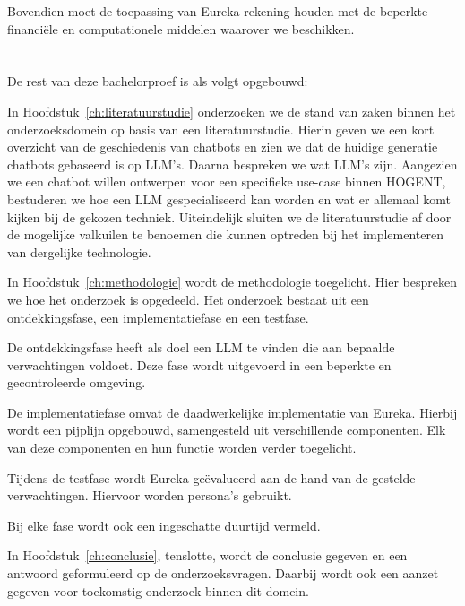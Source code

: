 Bovendien moet de toepassing van Eureka rekening houden met de beperkte financiële en computationele middelen waarover we beschikken.

\section{}%
\label{sec:opzet-bachelorproef}


De rest van deze bachelorproef is als volgt opgebouwd:

In Hoofdstuk~\ref{ch:literatuurstudie} onderzoeken we de stand van zaken binnen het onderzoeksdomein op basis van een literatuurstudie. Hierin geven we een kort overzicht van de geschiedenis van chatbots en zien we dat de huidige generatie chatbots gebaseerd is op \acrshort{LLM}'s. Daarna bespreken we wat \acrshort{LLM}'s zijn. Aangezien we een chatbot willen ontwerpen voor een specifieke use-case binnen HOGENT, bestuderen we hoe een \acrshort{LLM} gespecialiseerd kan worden en wat er allemaal komt kijken bij de gekozen techniek. Uiteindelijk sluiten we de literatuurstudie af door de mogelijke valkuilen te benoemen die kunnen optreden bij het implementeren van dergelijke technologie.

In Hoofdstuk~\ref{ch:methodologie} wordt de methodologie toegelicht. Hier bespreken we hoe het onderzoek is opgedeeld. Het onderzoek bestaat uit een ontdekkingsfase, een implementatiefase en een testfase.

De ontdekkingsfase heeft als doel een \acrshort{LLM} te vinden die aan bepaalde verwachtingen voldoet. Deze fase wordt uitgevoerd in een beperkte en gecontroleerde omgeving.

De implementatiefase omvat de daadwerkelijke implementatie van Eureka. Hierbij wordt een pijplijn opgebouwd, samengesteld uit verschillende componenten. Elk van deze componenten en hun functie worden verder toegelicht.

Tijdens de testfase wordt Eureka geëvalueerd aan de hand van de gestelde verwachtingen. Hiervoor worden persona's gebruikt.

Bij elke fase wordt ook een ingeschatte duurtijd vermeld.


In Hoofdstuk~\ref{ch:conclusie}, tenslotte, wordt de conclusie gegeven en een antwoord geformuleerd op de onderzoeksvragen. Daarbij wordt ook een aanzet gegeven voor toekomstig onderzoek binnen dit domein.